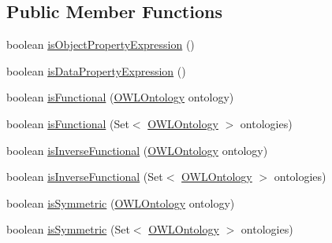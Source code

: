 \subsection*{Public Member Functions}
\begin{DoxyCompactItemize}
\item 
boolean \hyperlink{classuk_1_1ac_1_1manchester_1_1cs_1_1owl_1_1owlapi_1_1_o_w_l_object_property_expression_impl_abaf547092fd46169d559f7d7e593dbd2}{is\-Object\-Property\-Expression} ()
\item 
boolean \hyperlink{classuk_1_1ac_1_1manchester_1_1cs_1_1owl_1_1owlapi_1_1_o_w_l_object_property_expression_impl_aa2fba2d787f92c11c93aa1fee1a11caa}{is\-Data\-Property\-Expression} ()
\item 
boolean \hyperlink{classuk_1_1ac_1_1manchester_1_1cs_1_1owl_1_1owlapi_1_1_o_w_l_object_property_expression_impl_ac449154e234f3a38877507d5ac9812d5}{is\-Functional} (\hyperlink{interfaceorg_1_1semanticweb_1_1owlapi_1_1model_1_1_o_w_l_ontology}{O\-W\-L\-Ontology} ontology)
\item 
boolean \hyperlink{classuk_1_1ac_1_1manchester_1_1cs_1_1owl_1_1owlapi_1_1_o_w_l_object_property_expression_impl_a0dc6d4d4f53ab71284409595761c3a69}{is\-Functional} (Set$<$ \hyperlink{interfaceorg_1_1semanticweb_1_1owlapi_1_1model_1_1_o_w_l_ontology}{O\-W\-L\-Ontology} $>$ ontologies)
\item 
boolean \hyperlink{classuk_1_1ac_1_1manchester_1_1cs_1_1owl_1_1owlapi_1_1_o_w_l_object_property_expression_impl_a39493c1f9acb9e869959bbd94a66b3c1}{is\-Inverse\-Functional} (\hyperlink{interfaceorg_1_1semanticweb_1_1owlapi_1_1model_1_1_o_w_l_ontology}{O\-W\-L\-Ontology} ontology)
\item 
boolean \hyperlink{classuk_1_1ac_1_1manchester_1_1cs_1_1owl_1_1owlapi_1_1_o_w_l_object_property_expression_impl_ada422e2b921afcc562c8bde453d694dc}{is\-Inverse\-Functional} (Set$<$ \hyperlink{interfaceorg_1_1semanticweb_1_1owlapi_1_1model_1_1_o_w_l_ontology}{O\-W\-L\-Ontology} $>$ ontologies)
\item 
boolean \hyperlink{classuk_1_1ac_1_1manchester_1_1cs_1_1owl_1_1owlapi_1_1_o_w_l_object_property_expression_impl_a0b66e2cfa85186c6cfcbd57998759c48}{is\-Symmetric} (\hyperlink{interfaceorg_1_1semanticweb_1_1owlapi_1_1model_1_1_o_w_l_ontology}{O\-W\-L\-Ontology} ontology)
\item 
boolean \hyperlink{classuk_1_1ac_1_1manchester_1_1cs_1_1owl_1_1owlapi_1_1_o_w_l_object_property_expression_impl_ab8dd75b9f62b197d8a45d4d432f78522}{is\-Symmetric} (Set$<$ \hyperlink{interfaceorg_1_1semanticweb_1_1owlapi_1_1model_1_1_o_w_l_ontology}{O\-W\-L\-Ontology} $>$ ontologies)

\end{DoxyCompactItemize}
